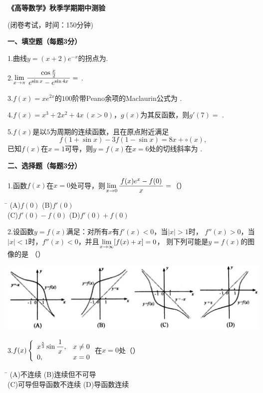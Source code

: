 \begin{center}
	{\Large\bf 《高等数学》秋季学期期中测验}
	
	(闭卷考试，时间：150分钟)
\end{center}

{\bf 一、填空题（每题3分）}

1.\;曲线$y=(x+2)e^{-x}$的拐点为\underline{\hspace{4cm}}.
\bs

2.\;$\lim\limits_{x\to{\pi}}\displaystyle\frac{\,{\cos\frac x2}\,}{\,{e^{\sin x}-e^{\sin4x}}\,}=$
\underline{\hspace{4cm}}.
\bs

3.\;$f(x)=xe^{2x}$的$100$阶带Peano余项的Maclaurin公式为
\underline{\hspace{4cm}}.
\bs

4.\;$f(x)=x^3+2x^2+4x\,(x>0)$，$g(x)$为其反函数，则$g'(7)=$
\underline{\hspace{4cm}}.
\bs

5.\;$f(x)$是以$5$为周期的连续函数，且在原点附近满足
$$f(1+\sin x)-3f(1-\sin x)=8x+\circ(x),$$
已知$f(x)$在$x=1$可导，则$y=f(x)$在$x=6$处的切线斜率为
\underline{\hspace{4cm}}.
\bs

{\bf 二、选择题（每题3分）}

1.\;函数$f(x)$在$x=0$处可导，则$\lim\limits_{x\to{0}}\displaystyle\frac{\,{f(x)e^x-f(0)}\,}{\,{x}\,}=$（\quad）%
\begin{tabbing}
	\hspace{8cm}\=\kill
	\quad\quad\quad(A)\;$f(0)$ \> 
	(B)\;$f'(0)$ \\ 
	\quad\quad\quad(C)\;$f'(0)-f(0)$\>
	(D)\;$f'(0)+f(0)$
\end{tabbing}

2.\;设函数$y=f(x)$满足：对所有$x$有$f'(x)<0$，当$|x|>1$时，
$f''(x)>0$，当$|x|<1$时，$f''(x)<0$，并且$\lim\limits_{x\to{\infty}}[f(x)+x]=0$，
则下列可能是$y=f(x)$的图像的是
（\quad）%
\begin{center}
	\includegraphics[width=\textwidth]{./UnitTest/images/abcd.pdf}
\end{center}

3.\;$f(x)\left\{\begin{array}{ll}
	x^{\frac53}\sin\displaystyle\frac{\,{1}\,}{\,{x}\,}, & x\ne 0\\ 0, & x=0
\end{array}\right.$在$x=0$处（\quad）%
\begin{tabbing}
	\hspace{8cm}\=\kill
	\quad\quad\quad(A)\;不连续 \> 
	(B)\;连续但不可导 \\ 
	\quad\quad\quad(C)\;可导但导函数不连续\>
	(D)\;导函数连续
\end{tabbing}

